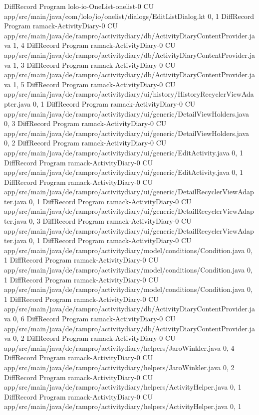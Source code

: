 DiffRecord Program lolo-io-OneList-onelist-0 CU app/src/main/java/com/lolo/io/onelist/dialogs/EditListDialog.kt  {0, 1}
DiffRecord Program ramack-ActivityDiary-0 CU app/src/main/java/de/rampro/activitydiary/db/ActivityDiaryContentProvider.java  {1, 4}
DiffRecord Program ramack-ActivityDiary-0 CU app/src/main/java/de/rampro/activitydiary/db/ActivityDiaryContentProvider.java  {1, 3}
DiffRecord Program ramack-ActivityDiary-0 CU app/src/main/java/de/rampro/activitydiary/db/ActivityDiaryContentProvider.java  {1, 5}
DiffRecord Program ramack-ActivityDiary-0 CU app/src/main/java/de/rampro/activitydiary/ui/history/HistoryRecyclerViewAdapter.java  {0, 1}
DiffRecord Program ramack-ActivityDiary-0 CU app/src/main/java/de/rampro/activitydiary/ui/generic/DetailViewHolders.java  {0, 3}
DiffRecord Program ramack-ActivityDiary-0 CU app/src/main/java/de/rampro/activitydiary/ui/generic/DetailViewHolders.java  {0, 2}
DiffRecord Program ramack-ActivityDiary-0 CU app/src/main/java/de/rampro/activitydiary/ui/generic/EditActivity.java  {0, 1}
DiffRecord Program ramack-ActivityDiary-0 CU app/src/main/java/de/rampro/activitydiary/ui/generic/EditActivity.java  {0, 1}
DiffRecord Program ramack-ActivityDiary-0 CU app/src/main/java/de/rampro/activitydiary/ui/generic/DetailRecyclerViewAdapter.java  {0, 1}
DiffRecord Program ramack-ActivityDiary-0 CU app/src/main/java/de/rampro/activitydiary/ui/generic/DetailRecyclerViewAdapter.java  {0, 3}
DiffRecord Program ramack-ActivityDiary-0 CU app/src/main/java/de/rampro/activitydiary/ui/generic/DetailRecyclerViewAdapter.java  {0, 1}
DiffRecord Program ramack-ActivityDiary-0 CU app/src/main/java/de/rampro/activitydiary/model/conditions/Condition.java  {0, 1}
DiffRecord Program ramack-ActivityDiary-0 CU app/src/main/java/de/rampro/activitydiary/model/conditions/Condition.java  {0, 1}
DiffRecord Program ramack-ActivityDiary-0 CU app/src/main/java/de/rampro/activitydiary/model/conditions/Condition.java  {0, 1}
DiffRecord Program ramack-ActivityDiary-0 CU app/src/main/java/de/rampro/activitydiary/db/ActivityDiaryContentProvider.java  {0, 6}
DiffRecord Program ramack-ActivityDiary-0 CU app/src/main/java/de/rampro/activitydiary/db/ActivityDiaryContentProvider.java  {0, 2}
DiffRecord Program ramack-ActivityDiary-0 CU app/src/main/java/de/rampro/activitydiary/helpers/JaroWinkler.java  {0, 4}
DiffRecord Program ramack-ActivityDiary-0 CU app/src/main/java/de/rampro/activitydiary/helpers/JaroWinkler.java  {0, 2}
DiffRecord Program ramack-ActivityDiary-0 CU app/src/main/java/de/rampro/activitydiary/helpers/ActivityHelper.java  {0, 1}
DiffRecord Program ramack-ActivityDiary-0 CU app/src/main/java/de/rampro/activitydiary/helpers/ActivityHelper.java  {0, 1}
